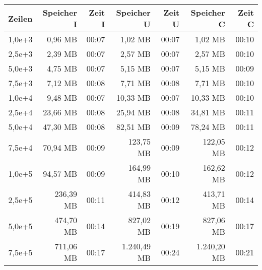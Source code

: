 \begin{table}
    \centering
    \begin{tabular}{|r|r|r|r|r|r|r|}
        \hline
        \textbf{Zeilen} & \textbf{Speicher I} & \textbf{Zeit I} & \textbf{Speicher U} & \textbf{Zeit U} & \textbf{Speicher C} & \textbf{Zeit C} \\ \hline
        1,0e+3          & 0,96 MB             & 00:07           & 1,02 MB             & 00:07           & 1,02 MB             & 00:10           \\ \hline
        2,5e+3          & 2,39 MB             & 00:07           & 2,57 MB             & 00:07           & 2,57 MB             & 00:10           \\ \hline
        5,0e+3          & 4,75 MB             & 00:07           & 5,15 MB             & 00:07           & 5,15 MB             & 00:09           \\ \hline
        7,5e+3          & 7,12 MB             & 00:08           & 7,71 MB             & 00:08           & 7,71 MB             & 00:10           \\ \hline
        1,0e+4          & 9,48 MB             & 00:07           & 10,33 MB            & 00:07           & 10,33 MB            & 00:10           \\ \hline
        2,5e+4          & 23,66 MB            & 00:08           & 25,94 MB            & 00:08           & 34,81 MB            & 00:11           \\ \hline
        5,0e+4          & 47,30 MB            & 00:08           & 82,51 MB            & 00:09           & 78,24 MB            & 00:11           \\ \hline
        7,5e+4          & 70,94 MB            & 00:09           & 123,75 MB           & 00:09           & 122,05 MB           & 00:12           \\ \hline
        1,0e+5          & 94,57 MB            & 00:09           & 164,99 MB           & 00:10           & 162,62 MB           & 00:12           \\ \hline
        2,5e+5          & 236,39 MB           & 00:11           & 414,83 MB           & 00:12           & 413,71 MB           & 00:14           \\ \hline
        5,0e+5          & 474,70 MB           & 00:14           & 827,02 MB           & 00:19           & 827,06 MB           & 00:17           \\ \hline
        7,5e+5          & 711,06 MB           & 00:17           & 1.240,49 MB         & 00:24           & 1.240,20 MB         & 00:21           \\ \hline

\end{tabular}
\end{table}
